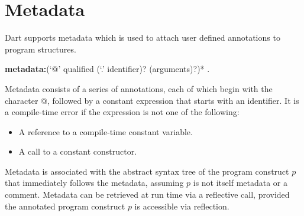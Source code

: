 \documentclass{article}
\begin{document}





\section{Metadata}

\LMHash{}
Dart supports metadata which is used to attach user defined annotations to program structures.

\begin{grammar}
{\bf metadata:}(`@' qualified ({\escapegrammar `.'} identifier)? (arguments)?)*
  .
\end{grammar}

\LMHash{}
Metadata consists of a series of annotations, each of which begin with the character @, followed by a constant expression that starts with an identifier.
It is a compile-time error if the expression is not one of the following:
\begin{itemize}
\item A reference to a compile-time constant variable.
\item A call to a constant constructor.
\end{itemize}

\LMHash{}
Metadata is associated with the abstract syntax tree of the program construct $p$ that immediately follows the metadata, assuming $p$ is not itself metadata or a comment.
Metadata can be retrieved at run time via a reflective call, provided the annotated program construct $p$ is accessible via reflection.


\end{document}
